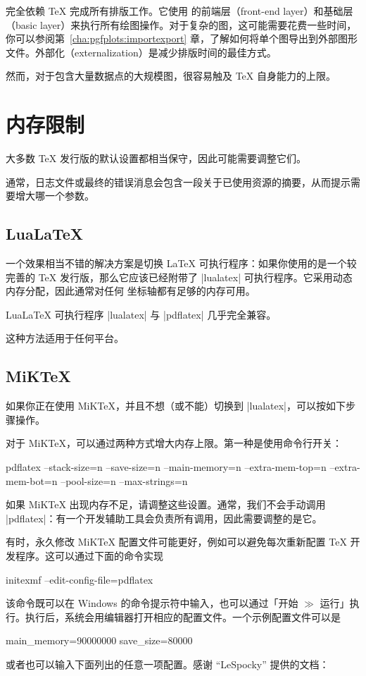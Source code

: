 {\PGFPlots{} 完全依赖 \TeX{} 完成所有排版工作。它使用 \PGF{} 的前端层（front-end layer）和基础层（basic layer）来执行所有绘图操作。对于复杂的图，这可能需要花费一些时间，你可以参阅第~\ref{cha:pgfplots:importexport} 章，了解如何将单个图导出到外部图形文件。外部化（externalization）是减少排版时间的最佳方式。

然而，对于包含大量数据点的大规模图，很容易触及 \TeX{} 自身能力的上限。


\section{内存限制}

大多数 \TeX{} 发行版的默认设置都相当保守，因此可能需要调整它们。

通常，日志文件或最终的错误消息会包含一段关于已使用资源的摘要，从而提示需要增大哪一个参数。


\subsection{Lua\LaTeX{}}

一个效果相当不错的解决方案是切换 \LaTeX{} 可执行程序：如果你使用的是一个较完善的 \TeX{} 发行版，那么它应该已经附带了 |lualatex| 可执行程序。它采用动态内存分配，因此通常对任何 \PGFPlots{} 坐标轴都有足够的内存可用。

Lua\LaTeX{} 可执行程序 |lualatex| 与 |pdflatex| 几乎完全兼容。

这种方法适用于任何平台。


\subsection{MiK\TeX{}}

如果你正在使用 MiK\TeX{}，并且不想（或不能）切换到 |lualatex|，可以按如下步骤操作。

对于 MiK\TeX{}，可以通过两种方式增大内存上限。第一种是使用命令行开关：
%
\begin{codeexample}
pdflatex
    --stack-size=n --save-size=n
    --main-memory=n --extra-mem-top=n --extra-mem-bot=n
    --pool-size=n --max-strings=n
\end{codeexample}
%
\noindent 如果 MiK\TeX{} 出现内存不足，请调整这些设置。通常，我们不会手动调用 |pdflatex|：有一个开发辅助工具会负责所有调用，因此需要调整的是它。

有时，永久修改 MiK\TeX{} 配置文件可能更好，例如可以避免每次重新配置 \TeX{} 开发程序。这可以通过下面的命令实现
%
\begin{codeexample}
initexmf --edit-config-file=pdflatex
\end{codeexample}
%
\noindent 该命令既可以在 Windows 的命令提示符中输入，也可以通过「开始 $\gg$ 运行」执行。执行后，系统会用编辑器打开相应的配置文件。一个示例配置文件可以是
%
\begin{codeexample}
main_memory=90000000
save_size=80000
\end{codeexample}
%
或者也可以输入下面列出的任意一项配置。感谢 ``LeSpocky'' 提供的文档：

}
